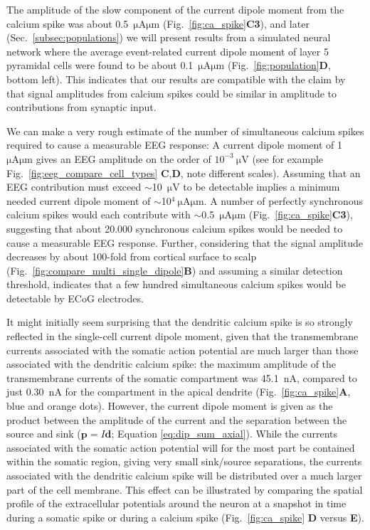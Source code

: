 \documentclass[preprint,10pt,authoryear]{elsarticle}
\begin{document}
The amplitude of the slow component of the current dipole moment from the calcium spike was about 0.5~$\si{\uA}\si{\um}$ (Fig.~\ref{fig:ca_spike}\textbf{C3}), and later (Sec.~\ref{subsec:populations}) we will present results from a simulated neural network where the average event-related current dipole moment of layer 5 pyramidal cells were found to be about 0.1~$\si{\uA}\si{\um}$ (Fig.~\ref{fig:population}{\bf D}, bottom left). This indicates that our results are compatible with the claim by \cite{SUZUKI2017} that signal amplitudes from calcium spikes could be similar in amplitude to contributions from synaptic input.

We can make a very rough estimate of the number of simultaneous calcium spikes required to cause a measurable EEG response: 
A current dipole moment of 1~$\si{\uA}\si{\um}$ gives an EEG amplitude on the order of $10^{-3}~\si{\uV}$ (see for example Fig.~\ref{fig:eeg_compare_cell_types} \textbf{C},\textbf{D}, note different scales).
Assuming that an EEG contribution must exceed $\sim$10~$\si{\uV}$ to be detectable \citep{NUNEZ2006, HAGEN2018} implies a minimum needed current dipole moment of 
$\sim$10$^4~\si{\uA}\si{\um}$. A number of perfectly synchronous calcium spikes would each contribute with $\sim$0.5~$\si{\uA}\si{\um}$ (Fig.~\ref{fig:ca_spike}\textbf{C3}), suggesting that about 20.000 synchronous calcium spikes would be needed to cause a measurable EEG response. Further, considering that the signal amplitude decreases by about 100-fold from cortical surface to scalp (Fig.~\ref{fig:compare_multi_single_dipole}\textbf{B}) and assuming a similar detection threshold, indicates that a few hundred simultaneous calcium spikes would be detectable by ECoG electrodes.

It might initially seem surprising that the dendritic calcium spike is so strongly reflected in the single-cell current dipole moment, given that the transmembrane currents associated with the somatic action potential are much larger than those associated with the dendritic calcium spike: the maximum amplitude of the transmembrane currents of the somatic compartment was 45.1~$\si{\nA}$, compared to just 0.30~$\si{\nA}$ for the compartment in the apical dendrite (Fig.~\ref{fig:ca_spike}{\bf A}, blue and orange dots). 
However, the current dipole moment is given as the product between the amplitude of the current and the separation between the source and sink ($\mathbf{p}=I\mathbf{d}$; Equation \ref{eq:dip_sum_axial}). While the currents associated with the somatic action potential will for the most part be contained within the somatic region, giving very small sink/source separations, the currents associated with the dendritic calcium spike will be distributed over a much larger part of the cell membrane.
This effect can be illustrated by comparing the spatial profile of the extracellular potentials around the neuron at a snapshot in time during a somatic spike or during a calcium spike (Fig.~\ref{fig:ca_spike} {\bf D} versus {\bf E}).
\end{document}

